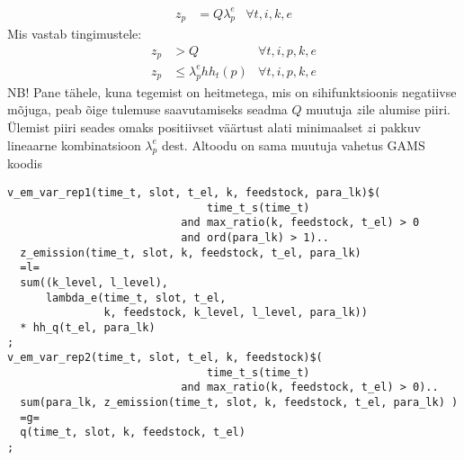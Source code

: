 \documentclass[10pt,a4paper]{article}
\begin{document}
\begin{align}
z_p &= Q \lambda^e_p & \forall t, i, k, e  
\end{align}
Mis vastab tingimustele:
\begin{align}
z_p &> Q & \forall t, i, p, k ,e  \\
z_p &\leq \lambda^e_p hh_t(p) & \forall t, i, p, k, e  
\end{align}
 NB! Pane tähele, kuna tegemist on heitmetega, mis on sihifunktsioonis negatiivse mõjuga, peab õige tulemuse saavutamiseks seadma $Q$ muutuja $z$ile alumise piiri. Ülemist piiri seades omaks positiivset väärtust alati minimaalset $z$i pakkuv lineaarne kombinatsioon $\lambda^e_p$ dest. Altoodu on sama muutuja vahetus GAMS koodis
\begin{verbatim}
v_em_var_rep1(time_t, slot, t_el, k, feedstock, para_lk)$(
                               time_t_s(time_t)
                           and max_ratio(k, feedstock, t_el) > 0
                           and ord(para_lk) > 1)..
  z_emission(time_t, slot, k, feedstock, t_el, para_lk)
  =l=
  sum((k_level, l_level),
      lambda_e(time_t, slot, t_el,
               k, feedstock, k_level, l_level, para_lk))
  * hh_q(t_el, para_lk)
;
v_em_var_rep2(time_t, slot, t_el, k, feedstock)$(
                               time_t_s(time_t)
                           and max_ratio(k, feedstock, t_el) > 0)..
  sum(para_lk, z_emission(time_t, slot, k, feedstock, t_el, para_lk) )
  =g=
  q(time_t, slot, k, feedstock, t_el)
;
\end{verbatim}
\end{document}
